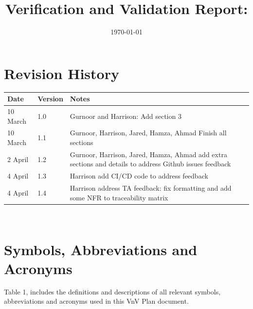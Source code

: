 \documentclass[12pt, titlepage]{article}
\begin{document}
\title{Verification and Validation Report: \progname} 
\author{\authname}
\date{\today}
	
\maketitle


\section{Revision History}

\begin{tabularx}{\textwidth}{p{3cm}p{2cm}X}
\toprule {\bf Date} & {\bf Version} & {\bf Notes}\\
\midrule
10 March & 1.0 & Gurnoor and Harrison: Add section 3\\
10 March & 1.1 & Gurnoor, Harrison, Jared, Hamza, Ahmad Finish all sections\\
2 April & 1.2 & Gurnoor, Harrison, Jared, Hamza, Ahmad add extra sections and details to address Github issues feedback\\
4 April & 1.3 & Harrison add CI/CD code to address feedback \\
4 April & 1.4 & Harrison address TA feedback: fix formatting and add some NFR to traceability matrix\\
\bottomrule
\end{tabularx}

~\newpage

\section{Symbols, Abbreviations and Acronyms}

Table 1, includes the definitions and descriptions of all relevant symbols,
abbreviations and acronyms used in this VnV Plan document.
\end{document}
